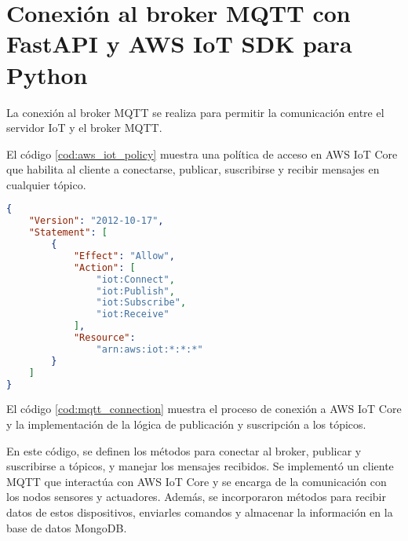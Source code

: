 \chapter{Conexión al broker MQTT con FastAPI y AWS IoT SDK para Python}
\label{AppendixE}

La conexión al broker MQTT se realiza para permitir la comunicación entre el
servidor IoT y el broker MQTT.

El código \ref{cod:aws_iot_policy} muestra una política de acceso en AWS IoT
Core que habilita al cliente a conectarse, publicar, suscribirse y recibir
mensajes en cualquier tópico.

\begin{lstlisting}[label=cod:aws_iot_policy,caption=Ejemplo de política de acceso en AWS IoT Core., language=JSON]
{
    "Version": "2012-10-17",
    "Statement": [
        {
            "Effect": "Allow",
            "Action": [
                "iot:Connect",
                "iot:Publish",
                "iot:Subscribe",
                "iot:Receive"
            ],
            "Resource": 
                "arn:aws:iot:*:*:*"
        }
    ]
}
\end{lstlisting}

El código \ref{cod:mqtt_connection} muestra el proceso de conexión a AWS IoT
Core y la implementación de la lógica de publicación y suscripción a los
tópicos.

En este código, se definen los métodos para conectar al broker, publicar y
suscribirse a tópicos, y manejar los mensajes recibidos. Se implementó un
cliente MQTT que interactúa con AWS IoT Core y se encarga de la comunicación
con los nodos sensores y actuadores. Además, se incorporaron métodos para
recibir datos de estos dispositivos, enviarles comandos y almacenar la
información en la base de datos MongoDB.

